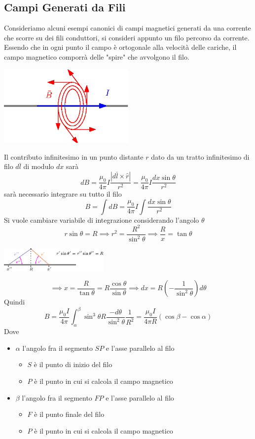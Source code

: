 \documentclass[10pt, letterpaper]{report}
\begin{document}
\subsection{Campi Generati da Fili}
Consideriamo alcuni esempi canonici di campi magnetici generati da una corrente che scorre su dei fili conduttori, si consideri appunto un filo percorso da corrente. Essendo che in ogni punto il campo è ortogonale alla velocità delle cariche, il campo magnetico comporrà delle "spire" che avvolgono il filo.
\begin{center}
    \includegraphics[width=0.5\textwidth ]{images/campoFIlo.eps}
\end{center}
Il contributo infinitesimo in un punto distante $r$ dato da un tratto infinitesimo di filo $d\bar l$ di modulo $dx$ sarà
$$ dB=\frac{\mu_0}{4\pi}I\frac{|d\bar l \times \hat r|}{r^2}=\frac{\mu_0}{4\pi}I\frac{dx\sin\theta}{r^2}$$
sarà necessario integrare su tutto il filo 
$$B=\int dB=\frac{\mu_0}{4\pi}I\int\frac{dx\sin\theta}{r^2} $$
Si vuole cambiare variabile di integrazione considerando l'angolo $\theta$ 
$$ r\sin\theta =R \implies r^2=\frac{R^2}{\sin^2\theta}\implies \frac{R}{x}=\tan\theta$$
\begin{center}
    \includegraphics[width=0.4\textwidth ]{images/campoMagFilo.eps}
\end{center}
$$ \implies x=\frac{R}{\tan \theta}=R\frac{\cos\theta}{\sin\theta}\implies dx=R(-\frac{1}{\sin^2\theta})d\theta$$
Quindi 
$$ B=\frac{\mu_0I}{4\pi}\int_\alpha^\beta \sin^3\theta R\frac{-d\theta}{\sin^2\theta}\frac{1}{R^2}= 
\frac{\mu_0I}{4\pi R}(\cos\beta-\cos\alpha)$$
Dove \begin{itemize}
    \item $\alpha$ l'angolo fra il segmento $SP$ e l'asse parallelo al filo \begin{itemize}
        \item $S$ è il punto di inizio del filo 
        \item $P$ è il punto in cui si calcola il campo magnetico
    \end{itemize}
    \item $\beta$ l'angolo fra il segmento $FP$ e l'asse parallelo al filo \begin{itemize}
        \item $F$ è il punto finale del filo 
        \item $P$ è il punto in cui si calcola il campo magnetico
    \end{itemize}
\end{itemize}
\end{document}
